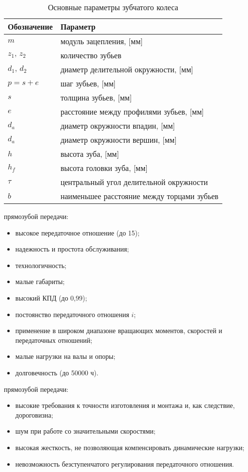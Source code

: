 \begin{table}[ht]
	\centering
	\selectfont
	\begin{tabular}{ll}
		\toprule
		Обозначение & Параметр \\ 
		\midrule
		$ m $ & модуль зацепления, [мм] \\
		$ z_1,\,z_2 $ & количество зубьев \\
		$ d_1,\,d_2 $ & диаметр делительной окружности, [мм] \\
		$ p=s+e $ & шаг зубьев, [мм] \\
		$ s $ & толщина зубьев, [мм] \\
		$ e $ & расстояние между профилями зубьев, [мм] \\
		$ d_a $ & диаметр окружности впадин, [мм] \\
		$ d_a $ & диаметр окружности вершин, [мм] \\
		$ h $ & высота зуба, [мм] \\
		$ h_f $ & высота головки зуба, [мм] \\
		$ \tau $ & центральный угол делительной окружности \\
		$ b $ & наименьшее расстояние между торцами зубьев \\
		\bottomrule
	\end{tabular}
	\caption{Основные параметры зубчатого колеса}
	\label{tab:parZ}
\end{table}


 прямозубой передачи:
\begin{itemize}
	\item высокое передаточное отношение (до 15);
	\item надежность и простота обслуживания;
	\item технологичность;
	\item малые габариты;
	\item высокий КПД (до 0,99);
	\item постоянство передаточного отношения $ i $;
	\item применение в широком диапазоне вращающих моментов, скоростей и передаточных отношений;
	\item малые нагрузки на валы и опоры;
	\item долговечность (до 50000 ч).
\end{itemize}

 прямозубой передачи:
\begin{itemize}
	\item высокие требования к точ­ности изготовления и монтажа и, как следствие, дороговизна;
	\item шум при работе со значительными скоростями;
	\item высокая жесткость, не позволяющая компенсировать динамические нагрузки;
	\item невозможность безступенчатого регулирования передаточного отношения.
\end{itemize}

